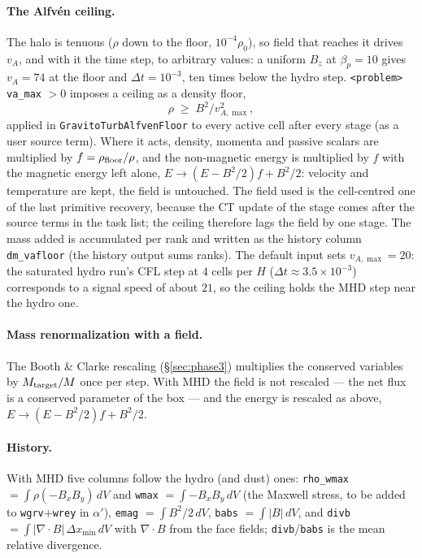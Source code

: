 \documentclass[11pt]{article}
\newcommand{\code}[1]{\texttt{#1}}
\newcommand{\fn}[1]{\texttt{\small #1}}
\begin{document}
\paragraph{The Alfv\'en ceiling.} The halo is tenuous ($\rho$ down to the floor,
$10^{-4}\rho_0$), so field that reaches it drives $v_A$, and with it the time step, to
arbitrary values: a uniform $B_z$ at $\beta_p = 10$ gives $v_A = 74$ at the floor and
$\Delta t = 10^{-3}$, ten times below the hydro step. \code{<problem> va\_max} $>0$ imposes
a ceiling as a density floor,
\begin{equation}
  \rho \;\ge\; B^2/v_{A,\max}^2 ,
\end{equation}
applied in \fn{GravitoTurbAlfvenFloor} to every active cell after every stage (as a user
source term). Where it acts, density, momenta and passive scalars are multiplied by
$f = \rho_{\rm floor}/\rho$, and the non-magnetic energy is multiplied by $f$ with the
magnetic energy left alone, $E \to (E - B^2/2)f + B^2/2$: velocity and temperature are
kept, the field is untouched. The field used is the cell-centred one of the last primitive
recovery, because the CT update of the stage comes after the source terms in the task
list; the ceiling therefore lags the field by one stage. The mass added is accumulated per
rank and written as the history column \code{dm\_vafloor} (the history output sums ranks).
The default input sets $v_{A,\max} = 20$: the saturated hydro run's CFL step at $4$ cells
per $H$ ($\Delta t \approx 3.5\times10^{-3}$) corresponds to a signal speed of about $21$,
so the ceiling holds the MHD step near the hydro one.

\paragraph{Mass renormalization with a field.} The Booth \& Clarke rescaling
(\S\ref{sec:phase3}) multiplies the conserved variables by $M_{\rm target}/M$ once per step.
With MHD the field is not rescaled --- the net flux is a conserved parameter of the box ---
and the energy is rescaled as above, $E \to (E - B^2/2)f + B^2/2$.

\paragraph{History.} With MHD five columns follow the hydro (and dust) ones:
\code{rho\_wmax} $=\int\rho(-B_xB_y)\,dV$ and \code{wmax} $=\int -B_xB_y\,dV$ (the Maxwell
stress, to be added to \code{wgrv}$+$\code{wrey} in $\alpha'$),
\code{emag} $=\int B^2/2\,dV$, \code{babs} $=\int|B|\,dV$, and
\code{divb} $=\int|\nabla\!\cdot\!B|\,\Delta x_{\min}\,dV$ with $\nabla\!\cdot\!B$ from the
face fields; \code{divb}/\code{babs} is the mean relative divergence.
\end{document}
